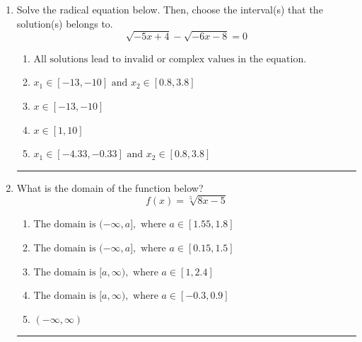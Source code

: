 \documentclass[14pt]{extbook}
\newcommand{\litem}[1]{\item#1\hspace*{-1cm}\rule{\textwidth}{0.4pt}}
\begin{document}
\begin{enumerate}
\litem{
Solve the radical equation below. Then, choose the interval(s) that the solution(s) belongs to.\[ \sqrt{-5 x + 4} - \sqrt{-6 x - 8} = 0 \]\begin{enumerate}[label=\Alph*.]
\item \( \text{All solutions lead to invalid or complex values in the equation.} \)
\item \( x_1 \in [-13, -10] \text{ and } x_2 \in [0.8,3.8] \)
\item \( x \in [-13,-10] \)
\item \( x \in [1,10] \)
\item \( x_1 \in [-4.33, -0.33] \text{ and } x_2 \in [0.8,3.8] \)

\end{enumerate} }
\litem{
What is the domain of the function below?\[ f(x) = \sqrt[5]{8 x - 5} \]\begin{enumerate}[label=\Alph*.]
\item \( \text{The domain is } (-\infty, a], \text{   where } a \in [1.55, 1.8] \)
\item \( \text{The domain is } (-\infty, a], \text{   where } a \in [0.15, 1.5] \)
\item \( \text{The domain is } [a, \infty), \text{   where } a \in [1, 2.4] \)
\item \( \text{The domain is } [a, \infty), \text{   where } a \in [-0.3, 0.9] \)
\item \( (-\infty, \infty) \)


\end{enumerate}}
\end{enumerate}
\end{document}
